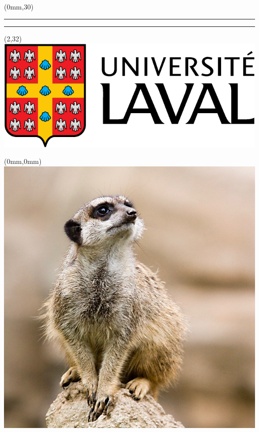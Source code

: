 \begingroup

\textblockorigin{0mm}{0mm}
\setlength{\parindent}{0mm}

\begin{textblock*}{8.5in}(0mm,30\TPVertModule)
  \textcolor{rouge}{\rule{2\TPHorizModule}{\TPVertModule}} %
  \textcolor{or}{\rule{\TPHorizModule}{\TPVertModule}}     %
\end{textblock*}

\begin{textblock*}{\TPHorizModule}(2\TPHorizModule,32\TPVertModule)
  \mbox{}
  \includegraphics[height=2.5\TPVertModule,keepaspectratio=true]{ul_p}
\end{textblock*}

\begin{textblock*}{8.5in}(0mm,0mm)
  \includegraphics[height=29.95\TPVertModule,keepaspectratio=true]{Suricata.jpg}
\end{textblock*}

